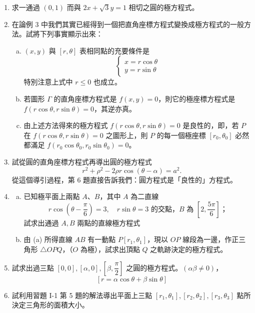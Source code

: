 \begin{enumerate}[1.]
  \item 求一通過 $(0, 1)$ 而與 $2x + \sqrt{3}y = 1$ 相切之圓的極方程式。

  \item 在論例 3 中我們其實已經得到一個把直角座標方程式變換成極方程式的一般方法。試將下列事實顯示出來：
  \begin{enumerate}[(a)]
    \item $(x, y)$ 與 $[r, \theta]$ 表相同點的充要條件是
    \[
      \begin{cases}
        x = r\cos\theta \\
        y = r\sin\theta
      \end{cases}
    \]
    特別注意上式中 $r \le 0$ 也成立。
    \item 若圖形 $\Gamma$ 的直角座標方程式是 $f(x, y) = 0$，則它的極座標方程式是 $f(r\cos\theta,\allowbreak r\sin\theta) = 0$，其逆亦真。
    \item 由上述方法得來的極方程式 $f(r\cos\theta, r\sin\theta) = 0$ 是良性的，即，若 $P$ 在 $f(r\cos\theta, r\sin\theta) = 0$ 之圖形上，則 $P$ 的每一個極座標 $[r_0, \theta_0]$ 必然都滿足 $f(r_0\cos\theta_0, r_0\sin\theta_0) = 0$。
  \end{enumerate}

  \item 試從圓的直角座標方程式再導出圓的極方程式
  \[
    r^2 + \rho^2 - 2\rho r\cos(\theta - \alpha) = a^2.
  \]
  從這個導引過程，第 6 題直接告訴我們：圓方程式是「良性的」方程式。

  \item[\textbf{*8.}]
  \begin{enumerate}[(a)]
    \item 已知極平面上兩點 $A$、$B$，其中 $A$ 為二直線
    \[
      r\cos\left(\theta - \frac{\pi}{6}\right) = 3, \quad r\sin\theta = 3 \text{ 的交點，} B \text{ 為 } \left[2, \frac{5\pi}{6}\right]\text{；}
    \]
    試求出通過 $A, B$ 兩點的直線極方程式
    \item 由 (a) 所得直線 $AB$ 有一動點 $P[r_1, \theta_1]$，現以 $OP$ 線段為一邊，作正三角形 $\triangle OPQ$，（$O$ 為極），試求出頂點 $Q$ 之軌跡決定的極方程式。
  \end{enumerate}

  \item 試求出過三點 $[0, 0], [\alpha, 0], \left[\beta, \dfrac{\pi}{2}\right]$ 之圓的極方程式。$(\alpha\beta \neq 0)$，
  \[
    [r = \alpha\cos\theta + \beta\sin\theta]
  \]

  \item[\textbf{*10.}] 試利用習題 I-1 第 5 題的解法導出平面上三點 $[r_1, \theta_1], [r_2, \theta_2], [r_3, \theta_3]$ 點所決定三角形的面積大小。
\end{enumerate}
